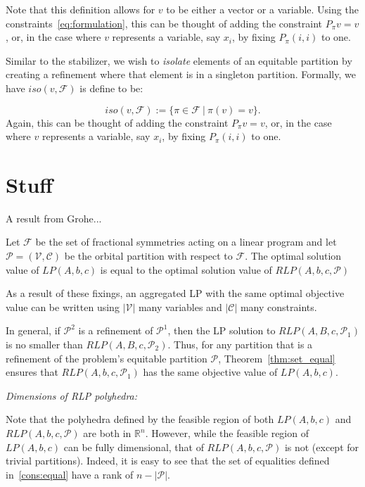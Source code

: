 \documentclass[runningheads]{llncs}
\newcommand{\cP}{{\mathcal P}}
\newcommand{\cF}{{\mathcal F}}
\newcommand{\cC}{{\mathcal C}}
\newcommand{\cV}{{\mathcal V}}
\begin{document}
\noindent Note that this definition allows for  $v$ to be either a vector or a variable. Using the constraints~\eqref{eq:formulation}, this can be thought of adding the constraint $P_\pi v = v$, or, in the case where $v$ represents a variable, say $x_i$, by fixing $P_\pi(i,i)$ to one. 

Similar to the stabilizer, we wish to {\em isolate} elements of an equitable partition by creating a refinement where that element is in a singleton partition. Formally, we have $iso(v, \cF)$ is define to be:


$$iso(v,\cF) := \{ \pi \in \cF\ | \ \pi(v) = v\}.$$ 
\noindent Again, this can be thought of adding the constraint $P_\pi v = v$, or, in the case where $v$ represents a variable, say $x_i$, by fixing $P_\pi(i,i)$ to one. 



\section{Stuff}

A result from Grohe...
\begin{theorem} \label{thm:set_equal}
	Let $\cF$ be the set of fractional symmetries acting on a linear program and let $\cP = (\cV, \cC)$ be the
	orbital partition with respect to $\cF$. The optimal solution
	value of $LP(A,b,c)$ is equal to the optimal solution value of $RLP(A,b,c, \cP)$
\end{theorem}


\begin{corollary}
	As a result of these fixings, an aggregated LP with the same optimal objective
	value can be written using $|\cV|$ many variables and $|\cC|$ many constraints.
\end{corollary}



In general, if $\cP^2$ is a refinement of $\cP^1$, then the LP solution
to $RLP(A,B,c,\cP_1)$ is no smaller than $RLP(A,B,c,\cP_2)$. Thus, for any
partition that is a refinement of the problem's equitable partition $\cP$,
Theorem~\ref{thm:set_equal} ensures that $RLP(A,b,c,\cP_1)$ has the same
objective value of $LP(A,b,c)$.




{\em Dimensions of RLP polyhedra:}

Note that the polyhedra defined by the feasible region of both $LP(A,b,c)$ and
$RLP(A,b,c,\cP)$ are both in $\mathbb{R}^n$. However, while the feasible
region of $LP(A,b,c)$ can be fully dimensional, that of $RLP(A,b,c,\cP)$ is not
(except for trivial partitions). Indeed, it is easy to see that the set of
equalities defined in~\eqref{cons:equal} have a rank of $n - |\cP|$.
\end{document}
